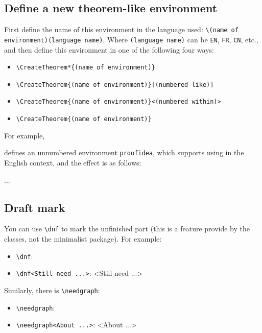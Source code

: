 \documentclass{minimart}
\providecommand{\minimalist}{\textsf{minimalist}}
\begin{document}
\subsection{Define a new theorem-like environment}

First define the name of this environment in the language used: \lstinline|\(name of environment)(language name)|. Where \lstinline|(language name)| can be \lstinline|EN|, \lstinline|FR|, \lstinline|CN|, etc., and then define this environment in one of the following four ways:
\begin{itemize}
    \item \lstinline|\CreateTheorem*{(name of environment)}|
    \item \lstinline|\CreateTheorem{(name of environment)}[(numbered like)]|
    \item \lstinline|\CreateTheorem{(name of environment)}<(numbered within)>|
    \item \lstinline|\CreateTheorem{(name of environment)}|
\end{itemize}

\def\proofideanameEN{Idea}

For example,
\begin{code}
  \def\proofideanameEN{Idea}
\end{code}
defines an unnumbered environment \lstinline|proofidea|, which supports using in the English context, and the effect is as follows:

\begin{proofidea}
    ...
\end{proofidea}

\subsection{Draft mark}

You can use \lstinline|\dnf| to mark the unfinished part (this is a feature provide by the classes, not the \minimalist{} package). For example:
\begin{itemize}
    \item \lstinline|\dnf|: \quad \dnf
    \item \lstinline|\dnf<Still need ...>|: \quad \dnf<Still need ...>
\end{itemize}

Similarly, there is \lstinline|\needgraph|:
\begin{itemize}
    \item \lstinline|\needgraph|: \needgraph
    \item \lstinline|\needgraph<About ...>|: \needgraph<About ...>
\end{itemize}
\end{document}

